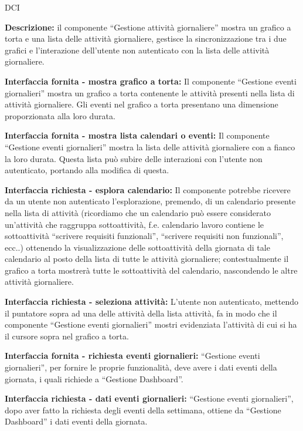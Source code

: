 \begin{listaPersonale}{DCI}

    \textbf{Descrizione:} il componente “Gestione attività giornaliere” mostra un grafico a torta e una lista delle attività giornaliere, gestisce la sincronizzazione tra i due grafici e l'interazione dell'utente non autenticato con la lista delle attività giornaliere.

    \textbf{Interfaccia fornita - mostra grafico a torta:} Il componente “Gestione eventi giornalieri” mostra un grafico a torta contenente le attività presenti nella lista di attività giornaliere. Gli eventi nel grafico a torta presentano una dimensione proporzionata alla loro durata.

    \textbf{Interfaccia fornita - mostra lista calendari o eventi:} Il componente “Gestione eventi giornalieri” mostra la lista delle attività giornaliere con a fianco la loro durata. Questa lista può subire delle interazioni con l'utente non autenticato, portando alla modifica di questa.

    \textbf{Interfaccia richiesta - esplora calendario:} Il componente potrebbe ricevere da un utente non autenticato l'esplorazione, premendo, di un calendario presente nella lista di attività (ricordiamo che un calendario può essere considerato un'attività che raggruppa sottoattività, f.e. calendario lavoro contiene le sottoattività “scrivere requisiti funzionali”, “scrivere requisiti non funzionali”, ecc..) ottenendo la visualizzazione delle sottoattività della giornata di tale calendario al posto della lista di tutte le attività giornaliere; contestualmente il grafico a torta mostrerà tutte le sottoattività del calendario, nascondendo le altre attività giornaliere.

    \textbf{Interfaccia richiesta - seleziona attività:} L'utente non autenticato, mettendo il puntatore sopra ad una delle attività della lista attività, fa in modo che il componente “Gestione eventi giornalieri” mostri evidenziata l'attività di cui si ha il cursore sopra nel grafico a torta.

    \textbf{Interfaccia fornita - richiesta eventi giornalieri:} “Gestione eventi giornalieri”, per fornire le proprie funzionalità, deve avere i dati eventi della giornata, i quali richiede a “Gestione Dashboard”.

    \textbf{Interfaccia richiesta - dati eventi giornalieri:} “Gestione eventi giornalieri”, dopo aver fatto la richiesta degli eventi della settimana, ottiene da “Gestione Dashboard” i dati eventi della giornata.



\end{listaPersonale}
